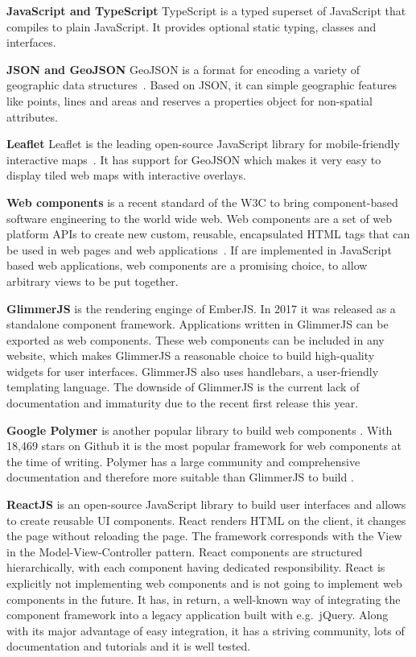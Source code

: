 \textbf{JavaScript and TypeScript}
TypeScript is a typed superset of JavaScript that compiles to plain JavaScript.
It provides optional static typing, classes and interfaces.

\textbf{JSON and GeoJSON}
GeoJSON is a format for encoding a variety of geographic data structures~\cite{GeoJSON2017}.
Based on JSON, it can simple geographic features like points, lines and areas and reserves a properties object for non-spatial attributes.

\textbf{Leaflet}
Leaflet is the leading open-source JavaScript library for mobile-friendly interactive maps~\cite{Leaflet2017}.
It has support for GeoJSON which makes it very easy to display tiled web maps with interactive overlays.

\textbf{Web components} is a recent standard of the W3C\cite{W3C2017} to bring component-based software engineering to the world wide web.
Web components are a set of web platform APIs to create new custom, reusable, encapsulated HTML tags that can be used in web pages and web applications~\cite{WebComponents2017}.
If \cmvs{} are implemented in JavaScript based web applications, web components are a promising choice, to allow arbitrary views to be put together.

\textbf{GlimmerJS} is the rendering enginge of EmberJS\cite{Ember2017}.
In 2017 it was released as a standalone component framework.
Applications written in GlimmerJS can be exported as web components.
These web components can be included in any website, which makes GlimmerJS a reasonable choice to build high-quality widgets for user interfaces.
GlimmerJS also uses handlebars\cite{Handlebars2017}, a user-friendly templating language.
The downside of GlimmerJS is the current lack of documentation and immaturity due to the recent first release this year.

\textbf{Google Polymer} is another popular library to build web components \cite{Polymer2017}.
With 18,469 stars on Github it is the most popular framework for web components at the time of writing.
Polymer has a large community and comprehensive documentation and therefore more suitable than GlimmerJS to build \cmvs{}.

\textbf{ReactJS} is an open-source JavaScript library to build user interfaces and allows to create reusable UI components.
React renders HTML on the client, it changes the page without reloading the page.
The framework corresponds with the View in the Model-View-Controller pattern.
React components are structured hierarchically, with each component having dedicated responsibility.
React is explicitly not implementing web components and is not going to implement web components in the future.
It has, in return, a well-known way of integrating the component framework into a legacy application built with e.g.\ jQuery.
Along with its major advantage of easy integration, it has a striving community, lots of documentation and tutorials and it is well tested.

